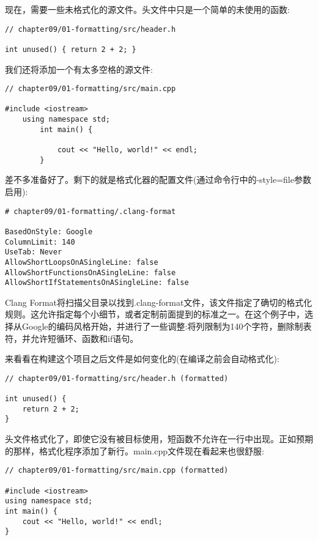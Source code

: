现在，需要一些未格式化的源文件。头文件中只是一个简单的未使用的函数:

\begin{lstlisting}[style=styleCXX]
// chapter09/01-formatting/src/header.h

int unused() { return 2 + 2; }
\end{lstlisting}

我们还将添加一个有太多空格的源文件:

\begin{lstlisting}[style=styleCXX]
// chapter09/01-formatting/src/main.cpp

#include <iostream>
	using namespace std;
		int main() {
			
			cout << "Hello, world!" << endl;
		}
\end{lstlisting}

差不多准备好了。剩下的就是格式化器的配置文件(通过命令行中的-{}style=file参数启用):

\begin{lstlisting}[style=stylePython]
# chapter09/01-formatting/.clang-format

BasedOnStyle: Google
ColumnLimit: 140
UseTab: Never
AllowShortLoopsOnASingleLine: false
AllowShortFunctionsOnASingleLine: false
AllowShortIfStatementsOnASingleLine: false
\end{lstlisting}

Clang Format将扫描父目录以找到.clang-format文件，该文件指定了确切的格式化规则。这允许指定每个小细节，或者定制前面提到的标准之一。在这个例子中，选择从Google的编码风格开始，并进行了一些调整:将列限制为140个字符，删除制表符，并允许短循环、函数和if语句。

来看看在构建这个项目之后文件是如何变化的(在编译之前会自动格式化):

\begin{lstlisting}[style=styleCXX]
// chapter09/01-formatting/src/header.h (formatted)

int unused() {
	return 2 + 2;
}
\end{lstlisting}

头文件格式化了，即使它没有被目标使用，短函数不允许在一行中出现。正如预期的那样，格式化程序添加了新行。main.cpp文件现在看起来也很舒服:

\begin{lstlisting}[style=styleCXX]
// chapter09/01-formatting/src/main.cpp (formatted)

#include <iostream>
using namespace std;
int main() {
	cout << "Hello, world!" << endl;
}
\end{lstlisting}

